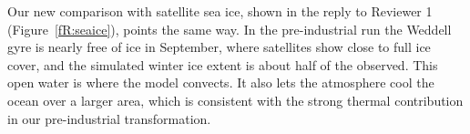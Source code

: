 Our new comparison with satellite sea ice, shown in the reply to Reviewer 1 (Figure~\ref{fR:seaice}), points the same way. In the pre-industrial run the Weddell gyre is nearly free of ice in September, where satellites show close to full ice cover, and the simulated winter ice extent is about half of the observed. This open water is where the model convects. It also lets the atmosphere cool the ocean over a larger area, which is consistent with the strong thermal contribution in our pre-industrial transformation.

